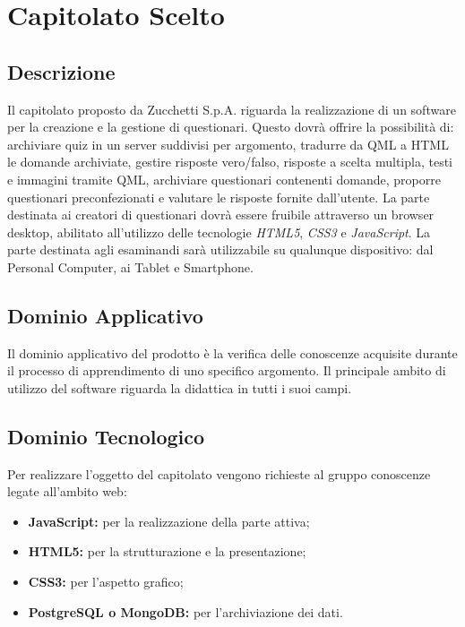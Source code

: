 \newpage
\section{Capitolato Scelto}
\subsection{Descrizione}
Il capitolato proposto da Zucchetti S.p.A. riguarda la realizzazione di un software per la creazione e la gestione di questionari. 
Questo dovrà offrire la possibilità di: archiviare quiz in un server suddivisi per argomento, tradurre da QML a HTML le domande archiviate, gestire risposte vero/falso, risposte a scelta multipla, testi e immagini tramite QML, archiviare questionari contenenti domande, proporre questionari preconfezionati e valutare le risposte fornite dall’utente.
La parte destinata ai creatori di questionari dovrà essere fruibile attraverso un browser desktop, abilitato all’utilizzo delle tecnologie \textit{HTML5}, \textit{CSS3} e \textit{JavaScript}.
La parte destinata agli esaminandi sarà utilizzabile su qualunque dispositivo: dal Personal Computer, ai Tablet e Smartphone.

\subsection{Dominio Applicativo}
Il dominio applicativo del prodotto è la verifica delle conoscenze acquisite durante il processo di apprendimento di uno specifico argomento.
Il principale ambito di utilizzo del software riguarda la didattica in tutti i suoi campi.

\subsection{Dominio Tecnologico}
Per realizzare l’oggetto del capitolato vengono richieste al gruppo conoscenze legate all’ambito web:
\begin{itemize}
\item \textbf{JavaScript:} per la realizzazione della parte attiva;
\item \textbf{HTML5:} per la strutturazione e la presentazione; 
\item \textbf{CSS3:} per l’aspetto grafico;
\item \textbf{PostgreSQL o MongoDB:} per l'archiviazione dei dati.
\end{itemize}

